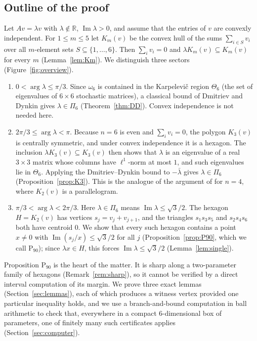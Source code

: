 \documentclass[11pt]{amsart}
\theoremstyle{definition}
\theoremstyle{remark}
\newcommand{\R}{\mathbb{R}}
\newcommand{\Pn}{\mathrm{P}_{90}}
\begin{document}
\subsection*{Outline of the proof}
Let $Av=\lambda v$ with $\lambda\notin\R$, $\operatorname{Im}\lambda>0$, and assume that the entries of $v$ are convexly independent. For $1\le m\le 5$ let $K_m(v)$ be the convex hull of the sums $\sum_{i\in S}v_i$ over all $m$-element sets $S\subseteq\{1,\dots,6\}$. Then $\sum_iv_i=0$ and $\lambda K_m(v)\subseteq K_m(v)$ for every $m$ (Lemma~\ref{lem:Km}). We distinguish three sectors (Figure~\ref{fig:overview}).
\begin{enumerate}[leftmargin=2em]
\item $0<\arg\lambda\le\pi/3$. Since $\omega_6$ is contained in the Karpelevi\v{c} region $\Theta_6$ (the set of eigenvalues of $6\times6$ stochastic matrices), a classical bound of Dmitriev and Dynkin gives $\lambda\in\Pi_6$ (Theorem~\ref{thm:DD}). Convex independence is not needed here.
\item $2\pi/3\le\arg\lambda<\pi$. Because $n=6$ is even and $\sum_iv_i=0$, the polygon $K_3(v)$ is centrally symmetric, and under convex independence it is a hexagon. The inclusion $\lambda K_3(v)\subseteq K_3(v)$ then shows that $\lambda$ is an eigenvalue of a real $3\times3$ matrix whose columns have $\ell^1$-norm at most $1$, and such eigenvalues lie in $\Theta_6$. Applying the Dmitriev--Dynkin bound to $-\bar\lambda$ gives $\lambda\in\Pi_6$ (Proposition~\ref{prop:K3}). This is the analogue of the argument of \cite{LPK15} for $n=4$, where $K_2(v)$ is a parallelogram.
\item $\pi/3<\arg\lambda<2\pi/3$. Here $\lambda\in\Pi_6$ means $\operatorname{Im}\lambda\le\sqrt3/2$. The hexagon $H=K_2(v)$ has vertices $s_j=v_j+v_{j+1}$, and the triangles $s_1s_3s_5$ and $s_2s_4s_6$ both have centroid $0$. We show that every such hexagon contains a point $x\neq0$ with $\operatorname{Im}(s_j/x)\le\sqrt3/2$ for all $j$ (Proposition~\ref{prop:P90}, which we call $\Pn$); since $\lambda x\in H$, this forces $\operatorname{Im}\lambda\le\sqrt3/2$ (Lemma~\ref{lem:single}).
\end{enumerate}
Proposition $\Pn$ is the heart of the matter. It is sharp along a two-parameter family of hexagons (Remark~\ref{rem:sharp}), so it cannot be verified by a direct interval computation of its margin. We prove three exact lemmas (Section~\ref{sec:lemmas}), each of which produces a witness vertex provided one particular inequality holds, and we use a branch-and-bound computation in ball arithmetic to check that, everywhere in a compact $6$-dimensional box of parameters, one of finitely many such certificates applies (Section~\ref{sec:computer}).
\end{document}

